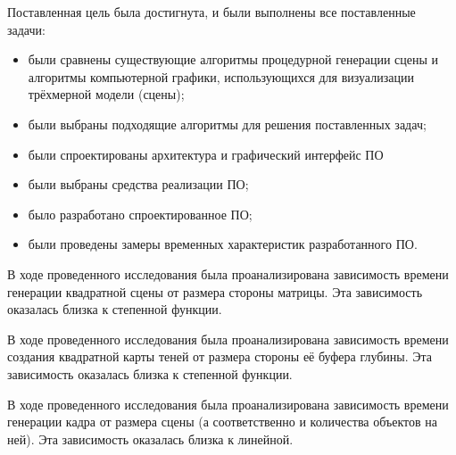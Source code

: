 
Поставленная цель была достигнута, и были выполнены все поставленные задачи:
\begin{itemize}
  \item были сравнены существующие алгоритмы процедурной генерации сцены и алгоритмы компьютерной графики, использующихся для визуализации трёхмерной модели (сцены);
  \item были выбраны подходящие алгоритмы для решения поставленных задач;
  \item были спроектированы архитектура и графический интерфейс ПО
  \item были выбраны средства реализации ПО;
  \item было разработано спроектированное ПО;
  \item были проведены замеры временных характеристик разработанного ПО.
\end{itemize}

В ходе проведенного исследования была проанализирована зависимость времени генерации квадратной сцены от размера стороны матрицы. Эта зависимость оказалась близка к степенной функции.

В ходе проведенного исследования была проанализирована зависимость времени создания квадратной карты теней от размера стороны её буфера глубины. Эта зависимость оказалась близка к степенной функции.

В ходе проведенного исследования была проанализирована зависимость времени генерации кадра от размера сцены (а соответственно и количества объектов на ней). Эта зависимость оказалась близка к линейной.
